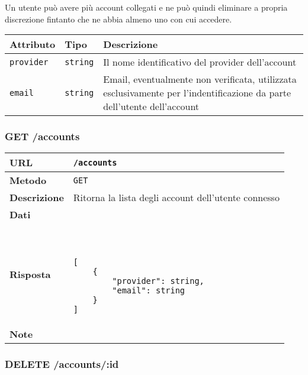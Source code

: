 \documentclass[12pt,a4paper]{article}
\begin{document}
        \par Un utente può avere più account collegati e ne può quindi eliminare
        a propria discrezione fintanto che ne abbia almeno uno con cui accedere.

        \begin{center}
            \begin{tabular}{ | l | l | l | } 
            \hline
                Attributo & Tipo & Descrizione \\
            \hline
                \texttt{provider} & \texttt{string} & 
                    Il nome identificativo del provider dell'account \\
                \texttt{email} & \texttt{string} & 
                    Email, eventualmente non verificata, utilizzata esclusivamente
                    per l'indentificazione da parte dell'utente dell'account \\
            \hline
            \end{tabular}
        \end{center}

        \subsubsection{GET /accounts}

            \begin{tabular}{|l|l|} 
                \hline
                \textbf{URL} & \texttt{/accounts} \\ \hline
                \textbf{Metodo} & \texttt{GET} \\ \hline
                \textbf{Descrizione} & 
                    Ritorna la lista degli account dell'utente connesso \\ \hline
                \textbf{Dati} & \\ \hline
                \textbf{Risposta} & \
                    \begin{lstlisting}[basicstyle={\ttfamily}]
[
    {
        "provider": string,
        "email": string
    }
]
                    \end{lstlisting} \\ \hline
                \textbf{Note} & \\ \hline
            \end{tabular}

        \subsubsection{DELETE /accounts/:id}
\end{document}
